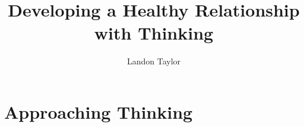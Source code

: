 \documentclass[14pt,letterpaper,oneside]{book} %
\title{Developing a Healthy Relationship with Thinking}
\author{Landon Taylor}
\date{}
\begin{document}
	
	\frontmatter
	
	\maketitle
	\tableofcontents
	
	\mainmatter
	
	\part{Approaching Thinking}
	
	
\end{document}
